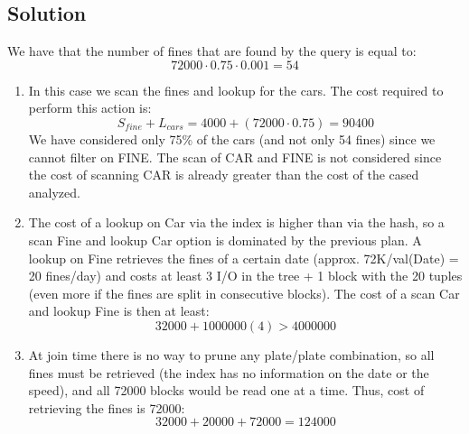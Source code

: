 \subsection*{Solution}
We have that the number of fines that are found by the query is equal to: 
\[72000 \cdot 0.75 \cdot 0.001=54\]
\begin{enumerate}
    \item In this case we scan the fines and lookup for the cars. 
        The cost required to perform this action is: 
        \[S_{fine}+L_{cars}=4000+\left(72000 \cdot 0.75\right) =90400\]
        We have considered only 75\% of the cars (and not only 54 fines) since we cannot filter on FINE. 
        The scan of CAR and FINE is not considered since the cost of scanning CAR is already greater than the cost of the cased analyzed. 
    \item The cost of a lookup on Car via the index is higher than via the hash, so a scan Fine and lookup Car option is dominated by the previous plan.
        A lookup on Fine retrieves the fines of a certain date (approx. 72K/val(Date) = 20 fines/day) and costs at least 3 I/O in the tree + 1 block with the 20 tuples (even more if the fines are split in consecutive blocks).
        The cost of a scan Car and lookup Fine is then at least:
        \[32000 + 1000000( 4 )> 4000000\]
    \item At join time there is no way to prune any plate/plate combination, so all fines must be retrieved (the index has no information on the date or the speed), and all 72000 blocks would be read one at a time. 
        Thus, cost of retrieving the fines is 72000:
        \[32000 + 20000 + 72000 = 124000\]
\end{enumerate}